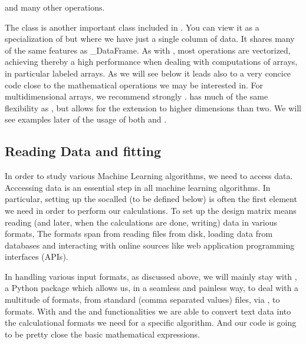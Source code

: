 \documentclass[letterpaper,10pt,english]{sphinxmanual}
\begin{document}
and many other operations.

The  class is another important class included in
. You can view it as a specialization of  but where
we have just a single column of data. It shares many of the same features as \_DataFrame. As with ,
most operations are vectorized, achieving thereby a high performance when dealing with computations of arrays, in particular labeled arrays.
As we will see below it leads also to a very concice code close to the mathematical operations we may be interested in.
For multidimensional arrays, we recommend strongly .  has much of the same flexibility as , but allows for the extension to higher dimensions than two. We will see examples later of the usage of both  and .


\subsection{Reading Data and fitting}
\label{\detokenize{chapter3:reading-data-and-fitting}}
In order to study various Machine Learning algorithms, we need to
access data. Acccessing data is an essential step in all machine
learning algorithms. In particular, setting up the so\sphinxhyphen{}called  (to be defined below) is often the first element we need in
order to perform our calculations. To set up the design matrix means
reading (and later, when the calculations are done, writing) data
in various formats, The formats span from reading files from disk,
loading data from databases and interacting with online sources
like web application programming interfaces (APIs).

In handling various input formats, as discussed above, we will mainly stay with ,
a Python package which allows us, in a seamless and painless way, to
deal with a multitude of formats, from standard  (comma separated
values) files, via ,  to  formats.  With 
and the   and  functionalities we are able to convert text data
into the calculational formats we need for a specific algorithm. And our code is going to be
pretty close the basic mathematical expressions.
\end{document}
